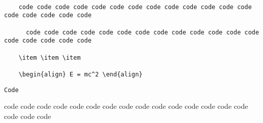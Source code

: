 \documentclass{article}
\begin{document}
    \begin{verbatim}

    code code code code code code code code code code code code code code code code code code

      code code code code code code code code code code code code code code code code code code

    \item \item \item

    \begin{align} E = mc^2 \end{align}

    \end{verbatim}

\begin{lstlisting}[caption={A very long and complicated caption that does not fit into one line}]
  Code
\end{lstlisting}


\begin{myverbatim}
    code code code code code code code code code code code code code code code code code code
\end{myverbatim}
\end{document}
